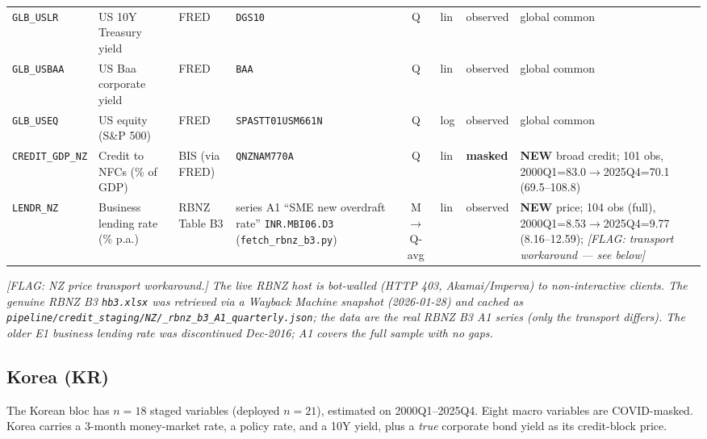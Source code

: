 {\begin{longtable}{@{}lp{2.9cm}p{1.9cm}p{2.0cm}cp{1.4cm}p{1.7cm}p{2.6cm}@{}}
\texttt{GLB\_USLR} & US 10Y Treasury yield & FRED & \texttt{DGS10} & Q & lin & observed & global common\\
\texttt{GLB\_USBAA} & US Baa corporate yield & FRED & \texttt{BAA} & Q & lin & observed & global common\\
\texttt{GLB\_USEQ} & US equity (S\&P 500) & FRED & \texttt{SPASTT01USM661N} & Q & log & observed & global common\\
\texttt{CREDIT\_GDP\_NZ} & Credit to NFCs (\% of GDP) & BIS (via FRED) & \texttt{QNZNAM770A} & Q & lin & \textbf{masked} & \textbf{NEW} broad credit; 101 obs, 2000Q1=83.0$\to$2025Q4=70.1 (69.5--108.8)\\
\texttt{LENDR\_NZ} & Business lending rate (\% p.a.) & RBNZ Table B3 & series A1 ``SME new overdraft rate'' \texttt{INR.\allowbreak MBI06.\allowbreak D3} (\texttt{fetch\_rbnz\_b3.py}) & M$\to$Q-avg & lin & observed & \textbf{NEW} price; 104 obs (full), 2000Q1=8.53$\to$2025Q4=9.77 (8.16--12.59); \textit{[FLAG: transport workaround --- see below]}\\
\end{longtable}}

\noindent\textit{[FLAG: NZ price transport workaround.] The live RBNZ host is
bot-walled (HTTP 403, Akamai/Imperva) to non-interactive clients. The genuine
RBNZ B3 \texttt{hb3.xlsx} was retrieved via a Wayback Machine snapshot
(2026-01-28) and cached as
\texttt{pipeline/credit\_staging/NZ/\_rbnz\_b3\_A1\_quarterly.json}; the data are
the real RBNZ B3 A1 series (only the transport differs). The older E1 business
lending rate was discontinued Dec-2016; A1 covers the full sample with no gaps.}

\subsection{Korea (KR)}\label{sec:data:KR}

The Korean bloc has $n=18$ staged variables (deployed $n=21$), estimated on
2000Q1--2025Q4. Eight macro variables are COVID-masked. Korea carries a 3-month
money-market rate, a policy rate, and a 10Y yield, plus a \emph{true} corporate
bond yield as its credit-block price.


